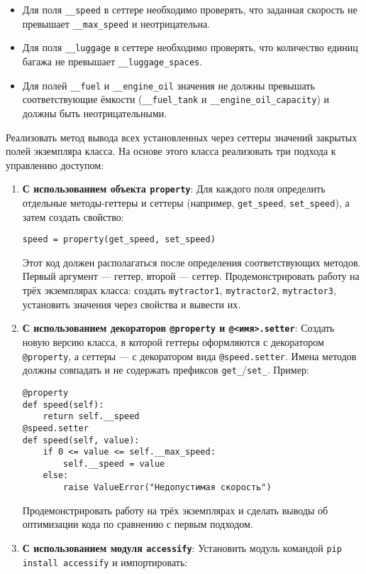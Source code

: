 \begin{enumerate}
\begin{itemize}
    \item Для поля \texttt{\_\_speed} в сеттере необходимо проверять, что заданная скорость не превышает \texttt{\_\_max\_speed} и неотрицательна.  
    \item Для поля \texttt{\_\_luggage} в сеттере необходимо проверять, что количество единиц багажа не превышает \texttt{\_\_luggage\_spaces}.
    \item Для полей \texttt{\_\_fuel} и \texttt{\_\_engine\_oil} значения не должны превышать соответствующие ёмкости (\texttt{\_\_fuel\_tank} и \texttt{\_\_engine\_oil\_capacity}) и должны быть неотрицательными.
\end{itemize}
Реализовать метод вывода всех установленных через сеттеры значений закрытых полей экземпляра класса.
На основе этого класса реализовать три подхода к управлению доступом:
\begin{enumerate}
    \item \textbf{С использованием объекта \texttt{property}}:  
    Для каждого поля определить отдельные методы-геттеры и сеттеры (например, \texttt{get\_speed}, \texttt{set\_speed}), а затем создать свойство:  
    \begin{verbatim}
speed = property(get_speed, set_speed)
    \end{verbatim}  
    Этот код должен располагаться после определения соответствующих методов. Первый аргумент — геттер, второй — сеттер.  
    Продемонстрировать работу на трёх экземплярах класса: создать \texttt{mytractor1}, \texttt{mytractor2}, \texttt{mytractor3}, установить значения через свойства и вывести их.
    \item \textbf{С использованием декораторов \texttt{@property} и \texttt{@<имя>.setter}}:  
    Создать новую версию класса, в которой геттеры оформляются с декоратором \texttt{@property}, а сеттеры — с декоратором вида \texttt{@speed.setter}. Имена методов должны совпадать и не содержать префиксов \texttt{get\_}/\texttt{set\_}.  
    Пример:  
    \begin{verbatim}
@property
def speed(self):
    return self.__speed
@speed.setter
def speed(self, value):
    if 0 <= value <= self.__max_speed:
        self.__speed = value
    else:
        raise ValueError("Недопустимая скорость")
    \end{verbatim}  
    Продемонстрировать работу на трёх экземплярах и сделать выводы об оптимизации кода по сравнению с первым подходом.
    \item \textbf{С использованием модуля \texttt{accessify}}:  
    Установить модуль командой \texttt{pip install accessify} и импортировать:  

\end{enumerate}
\end{enumerate}
